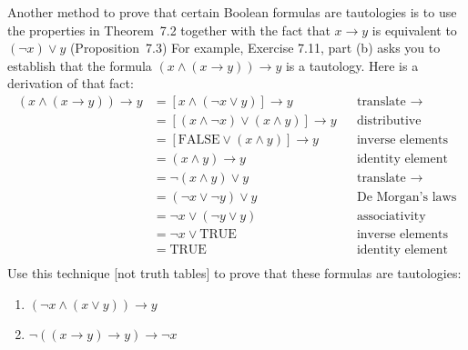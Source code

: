 \documentclass{article}
\theoremstyle{definition}
\begin{document}
\begin{question}
    Another method to prove that certain Boolean formulas
    are tautologies is to use the properties in Theorem~7.2
    together with the fact that $x \rightarrow y$ is equivalent
    to $(\neg x) \vee y$ (Proposition~7.3)
    For example, Exercise 7.11, part (b) asks you to establish that the formula $(x \wedge (x \rightarrow y)) \rightarrow y$ is 
    a tautology.  Here is a derivation of that fact:
    \begin{align*}
        (x \wedge (x \rightarrow y)) \rightarrow y
        &= [x \wedge (\neg x \vee y)] \rightarrow y
        && \text{translate $\rightarrow$} 
        \\
        &= [(x \wedge \neg x) \vee (x \wedge y)] \rightarrow y
        && \text{distributive}
        \\
        &= [\mathrm{FALSE} \vee (x\wedge y)] \rightarrow y
        && \text{inverse elements}
        \\
        &= (x\wedge y) \rightarrow y
        && \text{identity element}
        \\
        &= \neg(x\wedge y) \vee y
        && \text{translate $\rightarrow$}
        \\
        &= (\neg x \vee \neg y) \vee y
        && \text{De~Morgan's laws}
        \\
        &= \neg x \vee (\neg y \vee y)
        && \text{associativity}
        \\
        &= \neg x \vee \mathrm{TRUE}
        && \text{inverse elements}
        \\
        &= \mathrm{TRUE}
        && \text{identity element}
        \\
    \end{align*}
    Use this technique [not truth tables] to prove that these formulas
    are tautologies:
    \begin{enumerate}
        \item $(\neg x \wedge (x \vee y)) \rightarrow y$
        \item $\neg ( (x \rightarrow y) \rightarrow  y) \rightarrow \neg x$
    \end{enumerate}
\end{question}
\end{document}
